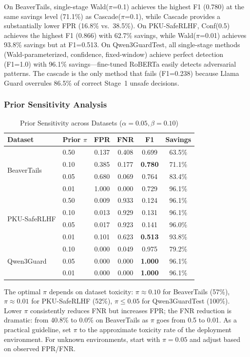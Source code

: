 \documentclass[acmtjournal, acmnowidth]{acmart}
\theoremstyle{definition}
\begin{document}
On BeaverTails, single-stage Wald($\pi$=0.1) achieves the highest F1 (0.780) at the same savings level (71.1\%) as Cascade($\pi$=0.1), while Cascade provides a substantially lower FPR (16.8\% vs.\ 38.5\%). On PKU-SafeRLHF, Conf(0.5) achieves the highest F1 (0.866) with 62.7\% savings, while Wald($\pi$=0.01) achieves 93.8\% savings but at F1=0.513. On Qwen3GuardTest, all single-stage methods (Wald-parameterized, confidence, fixed-window) achieve perfect detection (F1=1.0) with 96.1\% savings---fine-tuned RoBERTa easily detects adversarial patterns. The cascade is the only method that fails (F1=0.238) because Llama Guard overrules 86.5\% of correct Stage~1 unsafe decisions.

\subsubsection{Prior Sensitivity Analysis}
\label{sec:prior_ablation}

\begin{table}[h]
\caption{Prior Sensitivity across Datasets ($\alpha=0.05, \beta=0.10$)}
\label{tab:prior_ablation}
\small
\begin{tabular}{llcccc}
\toprule
Dataset & Prior $\pi$ & FPR & FNR & F1 & Savings \\
\midrule
\multirow{4}{*}{BeaverTails}
 & 0.50 & 0.137 & 0.408 & 0.699 & 63.5\% \\
 & 0.10 & 0.385 & 0.177 & \textbf{0.780} & 71.1\% \\
 & 0.05 & 0.680 & 0.069 & 0.764 & 83.4\% \\
 & 0.01 & 1.000 & 0.000 & 0.729 & 96.1\% \\
\midrule
\multirow{4}{*}{PKU-SafeRLHF}
 & 0.50 & 0.009 & 0.933 & 0.124 & 96.1\% \\
 & 0.10 & 0.013 & 0.929 & 0.131 & 96.1\% \\
 & 0.05 & 0.017 & 0.923 & 0.141 & 96.0\% \\
 & 0.01 & 0.101 & 0.623 & \textbf{0.513} & 93.8\% \\
\midrule
\multirow{3}{*}{Qwen3Guard}
 & 0.10 & 0.000 & 0.049 & 0.975 & 79.2\% \\
 & 0.05 & 0.000 & 0.000 & \textbf{1.000} & 96.1\% \\
 & 0.01 & 0.000 & 0.000 & \textbf{1.000} & 96.1\% \\
\bottomrule
\end{tabular}
\end{table}

The optimal $\pi$ depends on dataset toxicity: $\pi \approx 0.10$ for BeaverTails (57\%), $\pi \approx 0.01$ for PKU-SafeRLHF (52\%), $\pi \leq 0.05$ for Qwen3GuardTest (100\%). Lower $\pi$ consistently reduces FNR but increases FPR; the FNR reduction is dramatic: from 40.8\% to 0.0\% on BeaverTails as $\pi$ goes from 0.5 to 0.01. As a practical guideline, set $\pi$ to the approximate toxicity rate of the deployment environment. For unknown environments, start with $\pi=0.05$ and adjust based on observed FPR/FNR.
\end{document}
